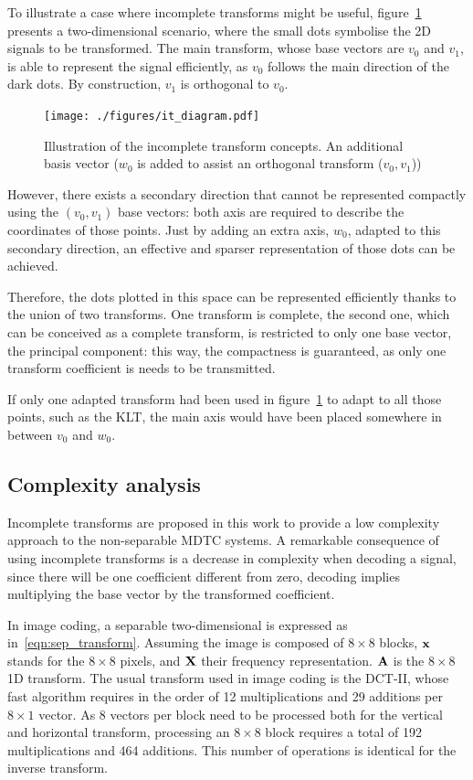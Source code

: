 \documentclass[11pt,a4paper,openright,twoside]{book}
\numberwithin{equation}{section} %
\numberwithin{figure}{section} %
\numberwithin{table}{section} %
\begin{document}
To illustrate a case where incomplete transforms might be useful,
figure~\ref{fig:it_diagram} presents a two-dimensional scenario, where the
small dots symbolise the 2D signals to be transformed.
The main transform, whose base vectors are $v_0$ and $v_1$, is able to
represent the signal efficiently, as $v_0$ follows the main direction of the
dark dots.
By construction, $v_1$ is orthogonal to $v_0$.

\begin{figure}[tp]
	\centering
	\texttt{[image: ./figures/it\_diagram.pdf]}
	\caption[Illustration of the incomplete transform concepts]
	{Illustration of the incomplete transform concepts.
	An additional basis vector ($w_0$ is added to assist an orthogonal
	transform ($v_0,v_1$))}
	\label{fig:it_diagram}
\end{figure}

However, there exists a secondary direction that cannot be represented
compactly using the $(v_0,v_1)$ base vectors:
both axis are required to describe the coordinates of those points.
Just by adding an extra axis, $w_0$, adapted to this secondary direction, an
effective and sparser representation of those dots can be achieved.

Therefore, the dots plotted in this space can be represented efficiently thanks
to the union of two transforms.
One transform is complete, the second one, which can be conceived as a
complete transform, is restricted to only one base vector, the principal
component:
this way, the compactness is guaranteed, as only one transform coefficient is
needs to be transmitted.

If only one adapted transform had been used in figure~\ref{fig:it_diagram}
to adapt to all those points, such as the \acl{KLT}, the main axis would have
been placed somewhere in between $v_0$ and $w_0$.

\subsection{Complexity analysis}
\label{sub:it_complexity_analysis}

Incomplete transforms are proposed in this work to provide a low complexity
approach to the non-separable \ac{MDTC} systems.
A remarkable consequence of using incomplete transforms is a decrease in
complexity when decoding a signal, since there will be one coefficient
different from zero, decoding implies multiplying the base vector by the
transformed coefficient.

In image coding, a separable two-dimensional is expressed as
in~\eqref{eqn:sep_transform}.
Assuming the image is composed of $8\times8$ blocks, $\mathbf{x}$ stands for the
$8\times8$ pixels, and $\mathbf{X}$ their frequency representation.
$\mathbf{A}$ is the $8\times8$ 1D transform.
The usual transform used in image coding is the \ac{DCT}-II, whose fast
algorithm requires in the order of 12 multiplications and 29 additions per
$8\times1$ vector.
As $8$ vectors per block need to be processed both for the vertical and
horizontal transform, processing an $8\times8$ block requires a total of 192
multiplications and 464 additions.
This number of operations is identical for the inverse transform.
\end{document}
